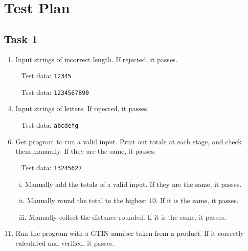 \documentclass[a4paper]{article}
\begin{document}
\pagebreak

\section{Test Plan}

\subsection{Task 1}
\begin{enumerate}
\item{Input strings of incorrect length. If rejected, it passes.}
\item[~]{Test data: \verb|12345|}
\item[~]{Test data: \verb|1234567890|}
\item{Input strings of letters. If rejected, it passes.}
\item[~]{Test data: \verb|abcdefg|}
\item{Get program to run a valid input. Print out totals at each stage, and check them manually. If they are the same, it passes.}
\item[~]{Test data: \verb|13245627|}
\item[~i.]{Manually add the totals of a valid input. If they are the same, it passes.}
\item[~ii.]{Manually round the total to the highest 10. If it is the same, it passes.}
\item[~iii.]{Manually collect the distance rounded. If it is the same, it passes.}
\item{Run the program with a GTIN number taken from a product. If it correctly calculated and verified, it passes.}
\end{enumerate}
\end{document}

